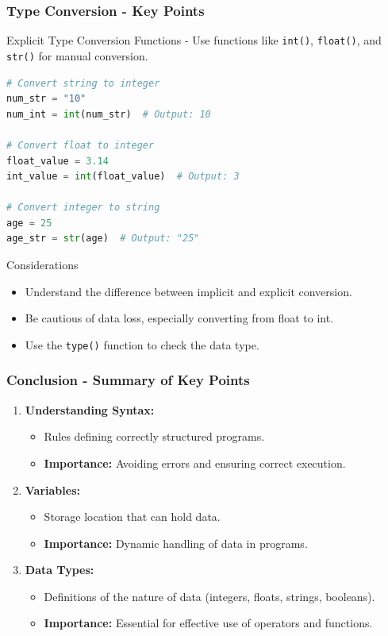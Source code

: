 \documentclass{beamer}
\begin{document}
\begin{frame}[fragile]
    \frametitle{Type Conversion - Key Points}
    \begin{block}{Explicit Type Conversion Functions}
        - Use functions like \texttt{int()}, \texttt{float()}, and \texttt{str()} for manual conversion.
        
        \begin{lstlisting}[language=Python]
# Convert string to integer
num_str = "10"
num_int = int(num_str)  # Output: 10

# Convert float to integer
float_value = 3.14
int_value = int(float_value)  # Output: 3

# Convert integer to string
age = 25
age_str = str(age)  # Output: "25"
        \end{lstlisting}
    \end{block}

    \begin{block}{Considerations}
        \begin{itemize}
            \item Understand the difference between implicit and explicit conversion.
            \item Be cautious of data loss, especially converting from float to int.
            \item Use the \texttt{type()} function to check the data type.
        \end{itemize}
    \end{block}
\end{frame}

\begin{frame}[fragile]
    \frametitle{Conclusion - Summary of Key Points}
    \begin{enumerate}
        \item \textbf{Understanding Syntax:}
        \begin{itemize}
            \item Rules defining correctly structured programs.
            \item \textbf{Importance:} Avoiding errors and ensuring correct execution.
        \end{itemize}

        \item \textbf{Variables:}
        \begin{itemize}
            \item Storage location that can hold data.
            \item \textbf{Importance:} Dynamic handling of data in programs.
        \end{itemize}

        \item \textbf{Data Types:}
        \begin{itemize}
            \item Definitions of the nature of data (integers, floats, strings, booleans).
            \item \textbf{Importance:} Essential for effective use of operators and functions.
        \end{itemize}
    \end{enumerate}
\end{frame}
\end{document}
